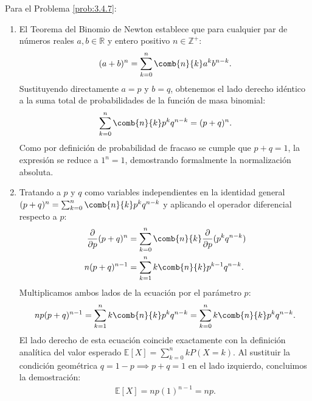 \begin{solucion}
	\label{sol:3.4.7}
	Para el Problema \ref{prob:3.4.7}:
	\begin{enumerate}
		\item El Teorema del Binomio de Newton establece que para cualquier par de números reales $a, b \in \mathbb{R}$ y entero positivo $n \in \mathbb{Z}^+$:
		\begin{align*}
			(a + b)^n = \sum_{k=0}^n \comb{n}{k} a^k b^{n-k}.
		\end{align*}
		Sustituyendo directamente $a = p$ y $b = q$, obtenemos el lado derecho idéntico a la suma total de probabilidades de la función de masa binomial:
		\begin{align*}
			\sum_{k=0}^n \comb{n}{k} p^k q^{n-k} = (p + q)^n.
		\end{align*}
		Como por definición de probabilidad de fracaso se cumple que $p + q = 1$, la expresión se reduce a $1^n = 1$, demostrando formalmente la normalización absoluta.
		\item Tratando a $p$ y $q$ como variables independientes en la identidad general $(p+q)^n = \sum_{k=0}^n \comb{n}{k} p^k q^{n-k}$ y aplicando el operador diferencial respecto a $p$:
		\begin{align*}
			\dfrac{\partial}{\partial p} (p+q)^n &= \sum_{k=0}^n \comb{n}{k} \dfrac{\partial}{\partial p} (p^k q^{n-k}) \\
			n(p+q)^{n-1} &= \sum_{k=1}^n k \comb{n}{k} p^{k-1} q^{n-k}.
		\end{align*}
		Multiplicamos ambos lados de la ecuación por el parámetro $p$:
		\begin{align*}
			np(p+q)^{n-1} = \sum_{k=1}^n k \comb{n}{k} p^k q^{n-k} = \sum_{k=0}^n k \comb{n}{k} p^k q^{n-k}.
		\end{align*}
		El lado derecho de esta ecuación coincide exactamente con la definición analítica del valor esperado $\mathbb{E}[X] = \sum_{k=0}^n k P(X = k)$. Al sustituir la condición geométrica $q = 1-p \implies p+q=1$ en el lado izquierdo, concluimos la demostración:
		\begin{align*}
			\mathbb{E}[X] = np(1)^{n-1} = np.
		\end{align*}
	\end{enumerate}
\end{solucion}


